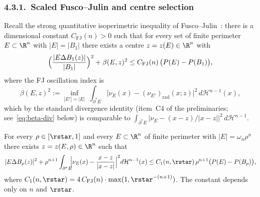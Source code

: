 \subsubsection{4.3.1.\ Scaled Fusco--Julin and centre selection}
\label{ssec:fj-scaled}

Recall the strong quantitative isoperimetric inequality of
Fusco--Julin~\cite[Thm.\ 1.1]{FJ2014}: there is a dimensional constant
$C_{\mathrm{FJ}}(n)>0$ such that for every set of finite perimeter
$E\subset\R^n$ with $|E|=|B_1|$ there exists a centre $z=z(E)\in\R^n$ with
\begin{equation}\label{eq:FJ-original}
   \Bigl(\frac{|E\Delta B_1(z)|}{|B_1|}\Bigr)^2
   +\beta(E,z)^2
   \le C_{\mathrm{FJ}}(n)\,\bigl(P(E)-P(B_1)\bigr),
\end{equation}
where the FJ oscillation index is
\begin{equation}\label{eq:FJ-osc-def}
   \beta(E,z)^2
   :=\inf_{|E'|=|E|}\;
   \int_{\partial^*E}\bigl|\nu_E(x)-(\nu_{E'})_{\mathrm{rad}}(x;z)\bigr|^2\,d\mathcal H^{n-1}(x),
\end{equation}
which by the standard divergence identity (item~C4 of the
preliminaries; see~\eqref{eq:beta-div} below) is comparable to
$\int_{\partial^*E}|\nu_E-(x-z)/|x-z||^2\,d\mathcal H^{n-1}$.

\begin{theorem}[Scaled Fusco--Julin on $\{|E|=\omega_n\rho^n\}$]
\label{thm:plan2-FJ-scaled}\label{prop:fj-scaled}
For every $\rho\in[\rstar,1]$ and every $E\subset\R^n$ of finite perimeter
with $|E|=\omega_n\rho^n$ there exists $z=z(E,\rho)\in\R^n$ such that
\begin{equation}\label{eq:plan2-FJ-scaled}
   |E\Delta B_\rho(z)|^2
   +\rho^{n+1}\int_{\partial^*E}\!\!\Bigl|\nu_E(x)-\frac{x-z}{|x-z|}\Bigr|^2 d\mathcal H^{n-1}(x)
   \le C_1(n,\rstar)\,\rho^{n+1}\bigl(P(E)-P(B_\rho)\bigr),
\end{equation}
where $C_1(n,\rstar)=4\,C_{\mathrm{FJ}}(n)\cdot\max(1,\rstar^{-(n+1)})$. The
constant depends only on $n$ and $\rstar$.
\end{theorem}

